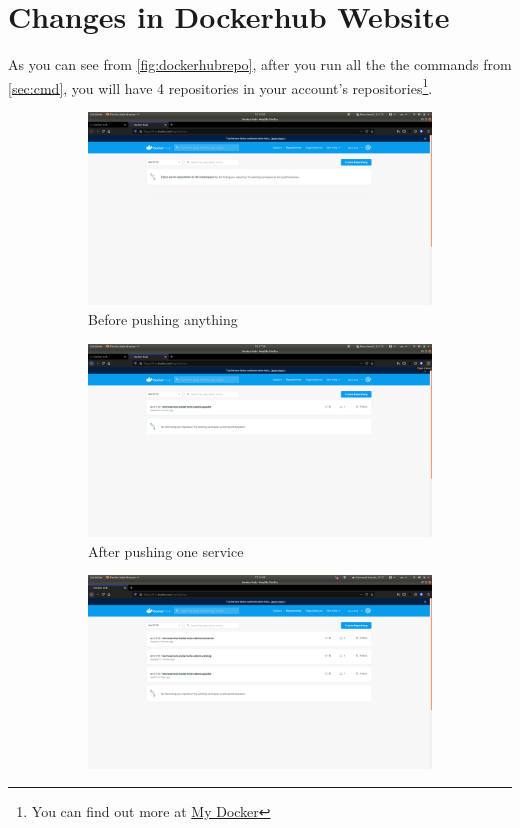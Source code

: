 \documentclass[11pt,a4paper]{article}
\begin{document}
  	\section{Changes in Dockerhub Website}
  	\label{sec:change}
  	As you can see from \ref{fig:dockerhubrepo}, after you run all the the commands from \ref{sec:cmd}, you will have 4 repositories in your account's repositories\footnote{You can find out more at \href{https://hub.docker.com/u/lam1910}{My Docker}}.
  	\begin{figure}[p]
		\centering
  		\begin{subfigure}[b]{\linewidth}
    		\includegraphics[width=\linewidth]{docker-repo-before.png}
    		\caption{Before pushing anything}
  		\end{subfigure}
  		\begin{subfigure}[b]{\linewidth}
    		\includegraphics[width=\linewidth]{docker-repo-after.png}
    		\caption{After pushing one service}
  		\end{subfigure}
  		\begin{subfigure}[b]{\linewidth}
    		\includegraphics[width=\linewidth]{docker-end-push.png}

\end{subfigure}
\end{figure}
\end{document}
